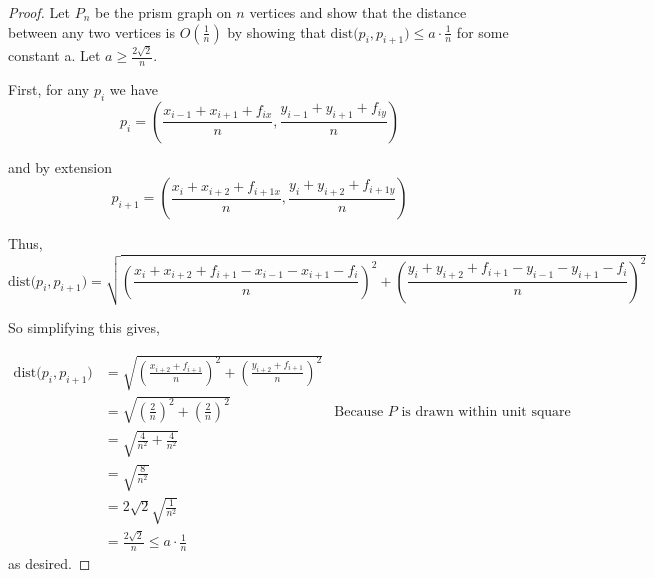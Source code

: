 \documentclass[11pt]{article}
\begin{document}
\begin{proof}
    Let $P_n$ be the prism graph on $n$ vertices and show that the distance between any two vertices is $O(\frac{1}{n})$ by showing that $\text{dist(}{p_i, p_{i+1})} \leq a \cdot \frac{1}{n}$ for some constant a. Let $a \geq \frac{2\sqrt{2}}{n}$.
    
    \bigskip
    
    First, for any $p_i$ we have
    \[
        p_i = \left(
            \frac{x_{i-1} + x_{i+1} + f_{ix}}{n} , %
            \frac{y_{i-1} + y_{i+1} + f_{iy}}{n} %
        \right)
    \]
    
    and by extension
    \[
        p_{i + 1} = \left(
        \frac{x_i + x_{i+2} + f_{i + 1x}}{n} , %
        \frac{y_i + y_{i+2} + f_{i + 1y}}{n} %
        \right)
    \]
    
    Thus,
    \[
    \text{dist(}{p_i, p_{i + 1}}) = \sqrt{
        \left(\frac{x_i + x_{i+2} + f_{i+1} - x_{i-1} - x_{i+1} - f_i}{n}\right)^2 +
        \left(\frac{y_i + y_{i+2} + f_{i+1} - y_{i-1} - y_{i+1} - f_i}{n}\right)^2
    }
    \]
    
    So simplifying this gives,
    
    \[\begin{aligned}
    \text{dist(}{p_i, p_{i + 1}})
    &= \sqrt{
        \left(\frac{x_{i+2} + f_{i+1}}{n}\right)^2 +
        \left(\frac{y_{i+2} + f_{i+1}}{n}\right)^2
        } \\
    &= \sqrt{
        \left(\frac{2}{n}\right)^2 +
        \left(\frac{2}{n}\right)^2
    } 
    &\text{Because $P$ is drawn within unit square} \\
    &= \sqrt{\frac{4}{n^2} + \frac{4}{n^2}} \\
    &= \sqrt{\frac{8}{n^2}} \\
    &= 2\sqrt{2}\sqrt{\frac{1}{n^2}} \\
    &= \frac{2\sqrt{2}}{n} \leq a \cdot \frac{1}{n}
    \end{aligned}\]
    as desired.    
\end{proof}
\end{document}

